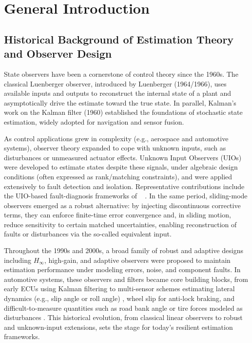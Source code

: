﻿\chapter{General Introduction}\label{chp1_intro}


\section{Historical Background of Estimation Theory and Observer Design}
State observers have been a cornerstone of control theory since the 1960s. The classical Luenberger observer, introduced by Luenberger (1964/1966), uses available inputs and outputs to reconstruct the internal state of a plant and asymptotically drive the estimate toward the true state. In parallel, Kalman's work on the Kalman filter (1960) established the foundations of stochastic state estimation, widely adopted for navigation and sensor fusion.

As control applications grew in complexity (e.g., aerospace and automotive systems), observer theory expanded to cope with unknown inputs, such as disturbances or unmeasured actuator effects. Unknown Input Observers (UIOs) were developed to estimate states despite these signals, under algebraic design conditions (often expressed as rank/matching constraints), and were applied extensively to fault detection and isolation. Representative contributions include the UIO-based fault-diagnosis frameworks of ~\cite{CORLESS1998757} . In the same period, sliding-mode observers emerged as a robust alternative: by injecting discontinuous corrective terms, they can enforce finite-time error convergence and, in sliding motion, reduce sensitivity to certain matched uncertainties, enabling reconstruction of faults or disturbances via the so-called equivalent input.

Throughout the 1990s and 2000s, a broad family of robust and adaptive designs including $H_\infty$, high-gain, and adaptive observers were proposed to maintain estimation performance under modeling errors, noise, and component faults. In automotive systems, these observers and filters became core building blocks, from early ECUs using Kalman filtering to multi-sensor schemes estimating lateral dynamics (e.g., slip angle or roll angle) \cite{VehicleDynamoicEstiamtion}, wheel slip for anti-lock braking, and difficult-to-measure quantities such as road bank angle or tire forces modeled as disturbances \cite{Hashemi04052017}. This historical evolution, from classical linear observers to robust and unknown-input extensions, sets the stage for today's resilient estimation frameworks.
